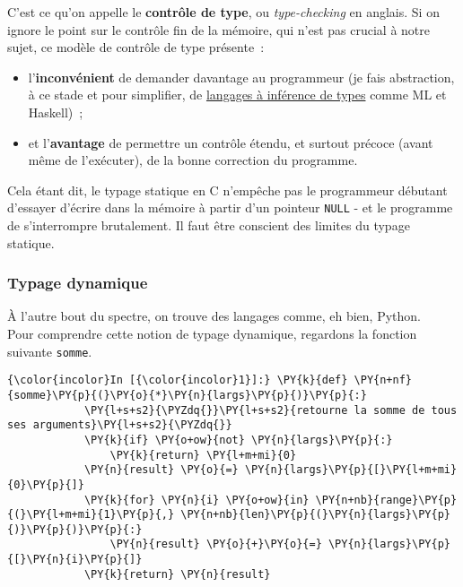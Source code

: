     C'est ce qu'on appelle le \textbf{contrôle de type}, ou
\emph{type-checking} en anglais. Si on ignore le point sur le contrôle
fin de la mémoire, qui n'est pas crucial à notre sujet, ce modèle de
contrôle de type présente~:

\begin{itemize}
\tightlist
\item
  l'\textbf{inconvénient} de demander davantage au programmeur (je fais
  abstraction, à ce stade et pour simplifier, de
  \href{https://en.wikipedia.org/wiki/Type_inference}{langages à
  inférence de types} comme ML et Haskell)~;
\item
  et l'\textbf{avantage} de permettre un contrôle étendu, et surtout
  précoce (avant même de l'exécuter), de la bonne correction du
  programme.
\end{itemize}

    Cela étant dit, le typage statique en C n'empêche pas le programmeur
débutant d'essayer d'écrire dans la mémoire à partir d'un pointeur
\texttt{NULL} - et le programme de s'interrompre brutalement. Il faut
être conscient des limites du typage statique.

    \hypertarget{typage-dynamique}{%
\subsubsection{Typage dynamique}\label{typage-dynamique}}

    À l'autre bout du spectre, on trouve des langages comme, eh bien,
Python.\\

    Pour comprendre cette notion de typage dynamique, regardons la fonction
suivante \texttt{somme}.

    \begin{Verbatim}[commandchars=\\\{\}]
{\color{incolor}In [{\color{incolor}1}]:} \PY{k}{def} \PY{n+nf}{somme}\PY{p}{(}\PY{o}{*}\PY{n}{largs}\PY{p}{)}\PY{p}{:}
            \PY{l+s+s2}{\PYZdq{}}\PY{l+s+s2}{retourne la somme de tous ses arguments}\PY{l+s+s2}{\PYZdq{}}
            \PY{k}{if} \PY{o+ow}{not} \PY{n}{largs}\PY{p}{:}
                \PY{k}{return} \PY{l+m+mi}{0}
            \PY{n}{result} \PY{o}{=} \PY{n}{largs}\PY{p}{[}\PY{l+m+mi}{0}\PY{p}{]}
            \PY{k}{for} \PY{n}{i} \PY{o+ow}{in} \PY{n+nb}{range}\PY{p}{(}\PY{l+m+mi}{1}\PY{p}{,} \PY{n+nb}{len}\PY{p}{(}\PY{n}{largs}\PY{p}{)}\PY{p}{)}\PY{p}{:}
                \PY{n}{result} \PY{o}{+}\PY{o}{=} \PY{n}{largs}\PY{p}{[}\PY{n}{i}\PY{p}{]}
            \PY{k}{return} \PY{n}{result}
\end{Verbatim}


